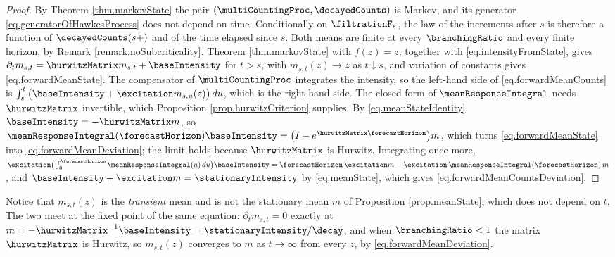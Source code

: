 \begin{proof}
 By Theorem \ref{thm.markovState} the pair $(\multiCountingProc, \decayedCounts)$ is Markov,
 and its generator \eqref{eq.generatorOfHawkesProcess} does not depend on time.
 Conditionally on $\filtrationF_{s}$,
 the law of the increments after $s$ is therefore a function of
 $\decayedCounts(s+)$ and of the time elapsed since $s$.
 Both means are finite at every $\branchingRatio$ and every finite horizon, by
 Remark \ref{remark.noSubcriticality}.
 Theorem \ref{thm.markovState} with $f(z) = z$, together with
 \eqref{eq.intensityFromState}, gives
 $\partial_t m_{s,t} = \hurwitzMatrix m_{s,t} + \baseIntensity$ for $t > s$,
 with $m_{s,t}(z) \to z$ as $t \downarrow s$,
 and variation of constants gives \eqref{eq.forwardMeanState}.
 The compensator of $\multiCountingProc$ integrates the intensity, so
 the left-hand side of \eqref{eq.forwardMeanCounts} is
 $\int_{s}^{t} \big( \baseIntensity + \excitation m_{s,u}(z) \big) \, du$,
 which is the right-hand side.
 The closed form of $\meanResponseIntegral$ needs $\hurwitzMatrix$ invertible,
 which Proposition \ref{prop.hurwitzCriterion} supplies.
 By \eqref{eq.meanStateIdentity}, $\baseIntensity = -\hurwitzMatrix m$, so
 $\meanResponseIntegral(\forecastHorizon)\baseIntensity
 = \big( I - e^{\hurwitzMatrix \forecastHorizon} \big) m$,
 which turns \eqref{eq.forwardMeanState} into \eqref{eq.forwardMeanDeviation};
 the limit holds because $\hurwitzMatrix$ is Hurwitz.
 Integrating once more,
 $\excitation \big( \int_{0}^{\forecastHorizon} \meanResponseIntegral(u) \, du \big)
 \baseIntensity
 = \forecastHorizon \, \excitation m
 - \excitation \, \meanResponseIntegral(\forecastHorizon) \, m$,
 and $\baseIntensity + \excitation m = \stationaryIntensity$ by \eqref{eq.meanState},
 which gives \eqref{eq.forwardMeanCountsDeviation}.
\end{proof}

\begin{remark}\label{remark.transientAgainstStationary}
 Notice that $m_{s,t}(z)$ is the \emph{transient} mean and is not the stationary mean $m$ of
 Proposition \ref{prop.meanState}, which does not depend on $t$.
 The two meet at the fixed point of the same equation:
 $\partial_t m_{s,t} = 0$ exactly at
 $m = -\hurwitzMatrix^{-1}\baseIntensity = \stationaryIntensity/\decay$,
 and when $\branchingRatio < 1$ the matrix $\hurwitzMatrix$ is Hurwitz, so $m_{s,t}(z)$
 converges to $m$ as $t \to \infty$ from every $z$,
 by \eqref{eq.forwardMeanDeviation}.
\end{remark}

